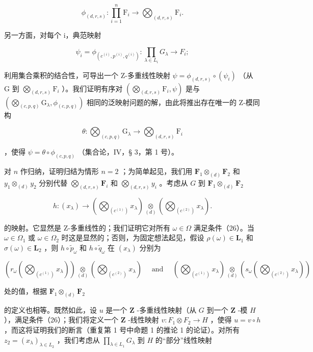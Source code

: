\[
\phi_ {(d, r, s)}: \prod_ {i = 1} ^ {n} \mathrm{F} _ {i} \rightarrow \bigotimes_ {(d, r, s)} \mathrm{F} _ {i}.
\]

另一方面，对每个 i，典范映射

\[
\psi_ {i} = \phi_ {(c ^ {(i)}, p ^ {(i)}, q ^ {(i)})}: \prod_ {\lambda \in L _ {i}} G _ {\lambda} \rightarrow F _ {i};
\]

利用集合乘积的结合性，可导出一个 Z-多重线性映射 \(\psi = \phi_{(d,r,s)}\circ (\psi_i)\) （从 G 到 \(\bigotimes_{(d,r,s)}\mathrm{F}_i\) ）。我们证明有序对 \(\left(\bigotimes_{(d,r,s)}\mathrm{F}_i,\psi\right)\) 是与 \(\left(\bigotimes_{(c,p,q)}\mathrm{G}_{\lambda},\phi_{(c,p,q)}\right)\) 相同的泛映射问题的解，由此将推出存在唯一的 Z-模同构

\[
\theta \colon \bigotimes_ {(c, p, q)} \mathrm{G} _ {\lambda} \rightarrow \bigotimes_ {(d, r, s)} \mathrm{F} _ {i}
\]

，使得 \(\psi = \theta \circ \phi_{(c,p,q)}\) （集合论，IV，§ 3，第 1 号）。

对 \(n\) 作归纳，证明归结为情形 \(n = 2\) ；为简单起见，我们用 \(\mathbf{F}_1 \otimes_{(d)} \mathbf{F}_2\) 和 \(y_1 \otimes_{(d)} y_2\) 分别代替 \(\bigotimes_{(d, r, s)} \mathbf{F}_i\) 和 \(\bigotimes_{(d, r, s)} y_i\) 。考虑从 \(G\) 到 \(\mathbf{F}_1 \otimes_{(d)} \mathbf{F}_2\)

\[
h \colon (x _ {\lambda}) \to \left(\bigotimes_ {(c ^ {(1)})} x _ {\lambda}\right) \underset {(d)} {\otimes} \left(\bigotimes_ {(c ^ {(2)})} x _ {\lambda}\right).
\]

的映射。它显然是 Z-多重线性的；我们证明它对所有 \(\omega\in\Omega\) 满足条件（26）。当 \(\omega\in\Omega_{1}\) 或 \(\omega\in\Omega_{2}\) 时这是显然的；否则，为固定想法起见，假设 \(\rho(\omega)\in\mathbf{L}_{1}\) 和 \(\sigma(\omega)\in\mathbf{L}_{2}\) ，则 \(h\circ\tilde{p}_{\omega}\) 和 \(h\circ\tilde{q}_{\omega}\) 在 \((x_{\lambda})\) 分别为

\[
\left(r _ {\omega} \left(\bigotimes_ {(c ^ {(1)})} x _ {\lambda}\right)\right) \underset {(d)} {\otimes} \left(\bigotimes_ {(c ^ {(2)})} x _ {\lambda}\right) \quad \text { and } \quad \left(\bigotimes_ {(c ^ {(1)})} x _ {\lambda}\right) \underset {(d)} {\otimes} \left(s _ {\omega} \left(\bigotimes_ {(c ^ {(2)})} x _ {\lambda}\right)\right)
\]

处的值，根据 \(\mathbf{F}_1\otimes_{(d)}\mathbf{F}_2\)

的定义也相等。既然如此，设 \(u\) 是一个 \(\mathbf{Z}\) -多重线性映射（从 \(G\) 到一个 \(\mathbf{Z}\) -模 \(H\) ），满足条件（26）；我们将定义一个 \(\mathbf{Z}\) -线性映射 \(v: F_1 \otimes F_2 \to H\) ，使得 \(u = v \circ h\) ，而这将证明我们的断言（重复第 1 号中命题 1 的推论 1 的论证）。对所有 \(z_2 = (x_\lambda)_{\lambda \in L_2}\) ，我们考虑从 \(\prod_{\lambda \in L_1} G_\lambda\) 到 \(H\) 的“部分”线性映射

